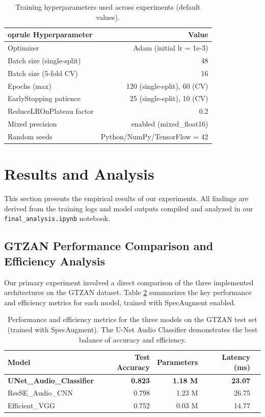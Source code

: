 \documentclass[11pt,a4paper]{article}
\begin{document}
\begin{table}[H]
\centering
\caption{Training hyperparameters used across experiments (default values).}
\label{tab:hyperparams}
\begin{tabular}{lr}
	oprule
Hyperparameter & Value \\
\midrule
Optimizer & Adam (initial lr = 1e-3) \\
Batch size (single-split) & 48 \\
Batch size (5-fold CV) & 16 \\
Epochs (max) & 120 (single-split), 60 (CV) \\
EarlyStopping patience & 25 (single-split), 10 (CV) \\
ReduceLROnPlateau factor & 0.2 \\
Mixed precision & enabled (mixed\_float16) \\
Random seeds & Python/NumPy/TensorFlow = 42 \\
\bottomrule
\end{tabular}
\end{table}

\section{Results and Analysis}
\label{sec:results}
This section presents the empirical results of our experiments. All findings are derived from the training logs and model outputs compiled and analyzed in our \texttt{final\_analysis.ipynb} notebook.

\subsection{GTZAN Performance Comparison and Efficiency Analysis}
Our primary experiment involved a direct comparison of the three implemented architectures on the GTZAN dataset. Table \ref{tab:gtzan_main_results} summarizes the key performance and efficiency metrics for each model, trained with SpecAugment enabled.

\begin{table}[H]
\centering
\caption{Performance and efficiency metrics for the three models on the GTZAN test set (trained with SpecAugment). The U-Net Audio Classifier demonstrates the best balance of accuracy and efficiency.}
\label{tab:gtzan_main_results}
\begin{tabular}{lrrrr}
\toprule
\textbf{Model} & \textbf{Test Accuracy} & \textbf{Parameters} & \textbf{Latency (ms)} \\
\midrule
\textbf{UNet\_Audio\_Classifier} & \textbf{0.823} & \textbf{1.18 M} & \textbf{23.07} \\
ResSE\_Audio\_CNN & 0.798 & 1.23 M & 26.75 \\
Efficient\_VGG & 0.752 & 0.03 M & 14.77 \\
\bottomrule
\end{tabular}
\end{table}
\end{document}
